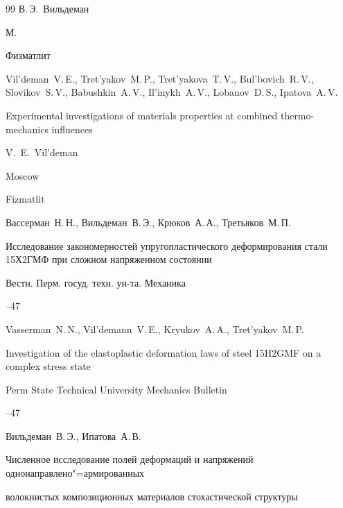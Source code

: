 \begin{thebibliography}{99}
\ed В.\,Э.~Вильдеман

\publaddr М.

\publ Физматлит



\misctransl

\by Vil'deman~V.\,E., Tret'yakov~M.\,P., Tret'yakova~T.\,V., Bul'bovich~R.\,V., Slovikov~S.\,V., Babushkin~A.\,V., Il'inykh~A.\,V., Lobanov~D.\,S., Ipatova~A.\,V.

\book Experimental investigations of materials properties at combined thermo-mechanics influences

\ed V.~E.~Vil'deman 

\publaddr Moscow

\publ Fizmatlit






\by Вассерман~Н.\,Н., Вильдеман~В.\,Э., Крюков~А.\,А., Третьяков~М.\,П.

\paper Исследование закономерностей упругопластического деформирования стали 15Х2ГМФ при сложном напряженном состоянии

\jour Вестн. Перм. госуд. техн. ун-та. Механика



--47

\misctransl 

\by Vasserman~N.\,N., Vil'demann~V.\,E., Kryukov~A.\,A., Tret'yakov~M.\,P.

\paper Investigation of the elastoplastic deformation laws of steel 15H2GMF on a complex stress state

\jour Perm State Technical University Mechanics Bulletin



--47






\by Вильдеман~В.\,Э., Ипатова~А.\,В.

\paper Численное исследование полей деформаций и напряжений однонаправлено"=армированных

 волокнистых композиционных материалов стохастической структуры


\end{thebibliography}
